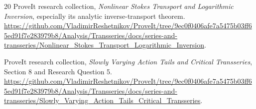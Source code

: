 \documentclass[11pt,a4paper]{article}
\numberwithin{equation}{section}
\theoremstyle{definition}
\theoremstyle{remark}
\begin{document}
\begin{thebibliography}{20}
ProveIt research collection,
\emph{Nonlinear Stokes Transport and Logarithmic Inversion},
especially its analytic inverse-transport theorem.
\url{https://github.com/VladimirReshetnikov/ProveIt/tree/9ec0f0406afe7a5475b03ff65ed91f7e283979b8/Analysis/Transseries/docs/series-and-transseries/Nonlinear_Stokes_Transport_Logarithmic_Inversion}.

ProveIt research collection,
\emph{Slowly Varying Action Tails and Critical Transseries},
Section 8 and Research Question 5.
\url{https://github.com/VladimirReshetnikov/ProveIt/tree/9ec0f0406afe7a5475b03ff65ed91f7e283979b8/Analysis/Transseries/docs/series-and-transseries/Slowly_Varying_Action_Tails_Critical_Transseries}.

\end{thebibliography}
\endgroup
\end{document}
